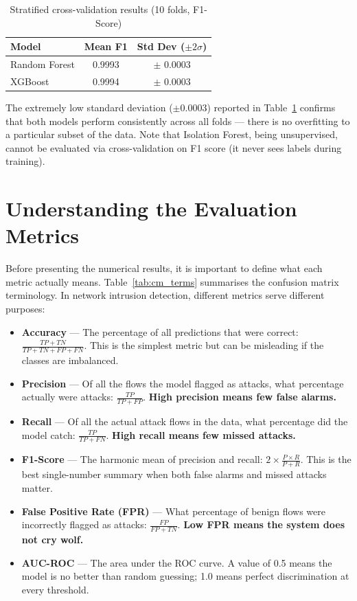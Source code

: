 \documentclass[12pt,a4paper]{report}
\begin{document}
\begin{table}[H]
\centering
\caption{Stratified cross-validation results (10 folds, F1-Score)}
\label{tab:cv_results}
\begin{tabular}{lcc}
\toprule
\textbf{Model} & \textbf{Mean F1} & \textbf{Std Dev ($\pm 2\sigma$)} \\
\midrule
Random Forest & 0.9993 & $\pm$ 0.0003 \\
XGBoost & 0.9994 & $\pm$ 0.0003 \\
\bottomrule
\end{tabular}
\end{table}

The extremely low standard deviation ($\pm 0.0003$) reported in Table~\ref{tab:cv_results} confirms that both models perform consistently across all folds --- there is no overfitting to a particular subset of the data. Note that Isolation Forest, being unsupervised, cannot be evaluated via cross-validation on F1 score (it never sees labels during training).

\section{Understanding the Evaluation Metrics}

Before presenting the numerical results, it is important to define what each metric actually means. Table~\ref{tab:cm_terms} summarises the confusion matrix terminology. In network intrusion detection, different metrics serve different purposes:

\begin{itemize}
    \item \textbf{Accuracy} — The percentage of all predictions that were correct: $\frac{TP + TN}{TP + TN + FP + FN}$. This is the simplest metric but can be misleading if the classes are imbalanced.

    \item \textbf{Precision} — Of all the flows the model flagged as attacks, what percentage actually were attacks: $\frac{TP}{TP + FP}$. \textbf{High precision means few false alarms.}

    \item \textbf{Recall} — Of all the actual attack flows in the data, what percentage did the model catch: $\frac{TP}{TP + FN}$. \textbf{High recall means few missed attacks.}

    \item \textbf{F1-Score} — The harmonic mean of precision and recall: $2 \times \frac{P \times R}{P + R}$. This is the best single-number summary when both false alarms and missed attacks matter.

    \item \textbf{False Positive Rate (FPR)} — What percentage of benign flows were incorrectly flagged as attacks: $\frac{FP}{FP + TN}$. \textbf{Low FPR means the system does not cry wolf.}

    \item \textbf{AUC-ROC} — The area under the ROC curve. A value of 0.5 means the model is no better than random guessing; 1.0 means perfect discrimination at every threshold.
\end{itemize}
\end{document}
